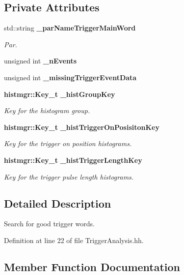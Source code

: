 \subsection*{Private Attributes}
\begin{DoxyCompactItemize}
\item 
std::string {\bf \_\-parNameTriggerMainWord}
\begin{DoxyCompactList}\small\item\em Par. \item\end{DoxyCompactList}\item 
unsigned int {\bfseries \_\-nEvents}\label{classCALICE_1_1TriggerAnalysis_ad08524b6d02fb2d7b75b172652b1d435}

\item 
unsigned int {\bfseries \_\-missingTriggerEventData}\label{classCALICE_1_1TriggerAnalysis_aee5bbae4a0166c2432de8eaa16fa6dca}

\item 
{\bf histmgr::Key\_\-t} {\bf \_\-histGroupKey}
\begin{DoxyCompactList}\small\item\em Key for the histogram group. \item\end{DoxyCompactList}\item 
{\bf histmgr::Key\_\-t} {\bf \_\-histTriggerOnPosisitonKey}
\begin{DoxyCompactList}\small\item\em Key for the trigger on position histograms. \item\end{DoxyCompactList}\item 
{\bf histmgr::Key\_\-t} {\bf \_\-histTriggerLengthKey}
\begin{DoxyCompactList}\small\item\em Key for the trigger pulse length histograms. \item\end{DoxyCompactList}\end{DoxyCompactItemize}


\subsection{Detailed Description}
Search for good trigger words. 

Definition at line 22 of file TriggerAnalysis.hh.

\subsection{Member Function Documentation}
